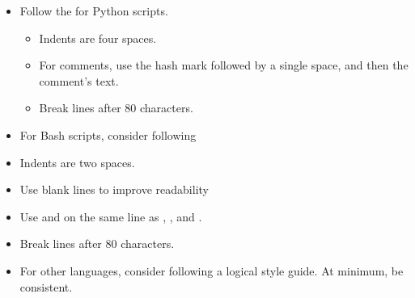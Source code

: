 \documentclass[letterpaper,10pt,english]{sphinxmanual}
\begin{document}
\begin{sphinxVerbatim}[commandchars=\\\{\}]
 
 
       
\end{sphinxVerbatim}
\begin{itemize}
\item {} 
Follow the  for Python scripts.
\begin{itemize}
\item {} 
Indents are four spaces.

\item {} 
For comments, use the \sphinxcode{\sphinxupquote{\#}} hash mark followed by a single space, and
then the comment’s text.

\item {} 
Break lines after 80 characters.

\end{itemize}

\item {} 
For Bash scripts, consider following 

\end{itemize}
\begin{itemize}
\item {} 
Indents are two spaces.

\item {} 
Use blank lines to improve readability

\item {} 
Use  and  on the same line as , , and
.

\item {} 
Break lines after 80 characters.

\end{itemize}
\begin{itemize}
\item {} 
For other languages, consider following a logical style guide. At minimum, be
consistent.

\end{itemize}
\end{document}
